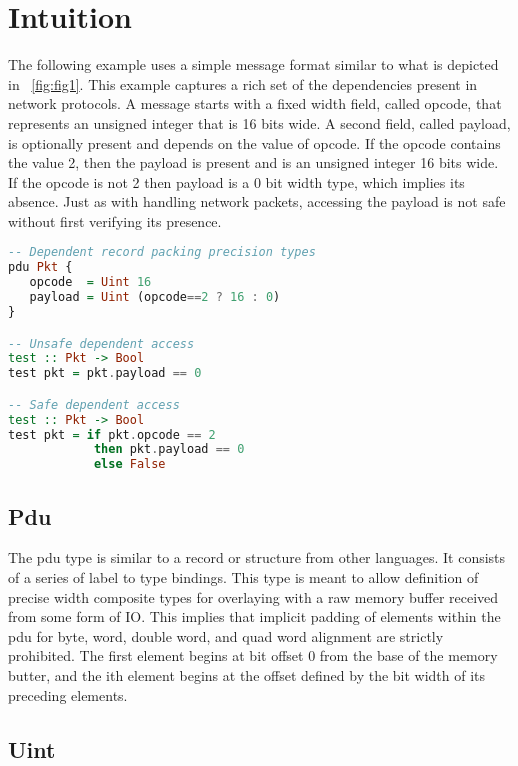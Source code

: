 \section{Intuition}

The following example uses a simple message format similar to what is depicted
in ~\ref{fig:fig1}. This example captures a rich set of the dependencies present
in network protocols. A message starts with a fixed width field, called opcode,
that represents an unsigned integer that is 16 bits wide. A second field, called
payload, is optionally present and depends on the value of opcode. If the opcode
contains the value 2, then the payload is present and is an unsigned integer 16
bits wide. If the opcode is not 2 then payload is a 0 bit width type, which 
implies its absence. Just as with handling network packets, accessing the 
payload is not safe without first verifying its presence.

\begin{lstlisting}[language=Haskell, caption={Message Format Usage Example}]
-- Dependent record packing precision types
pdu Pkt {
   opcode  = Uint 16
   payload = Uint (opcode==2 ? 16 : 0)
}

-- Unsafe dependent access
test :: Pkt -> Bool
test pkt = pkt.payload == 0

-- Safe dependent access
test :: Pkt -> Bool
test pkt = if pkt.opcode == 2 
            then pkt.payload == 0 
            else False
\end{lstlisting}

\subsection{Pdu}

The pdu type is similar to a record or structure from other languages. It
consists of a series of label to type bindings. This type is meant to allow
definition of precise width composite types for overlaying with a raw memory
buffer received from some form of IO. This implies that implicit padding of
elements within the pdu for byte, word, double word, and quad word alignment
are strictly prohibited. The first element begins at bit offset 0 from the base
of the memory butter, and the ith element begins at the offset defined by the
bit width of its preceding elements.

\subsection{Uint}

